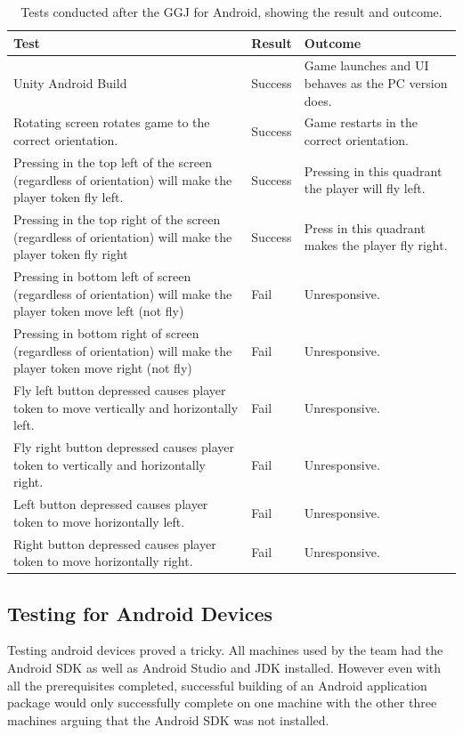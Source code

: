 \documentclass[12pt]{article}
\begin{document}
\begin{table}[H]
\centering
\begin{tabular}{| p{6cm} | p{1.5cm} | p{6cm} |}
     \hline
     \bf Test & \bf Result & \bf Outcome\\ \hline
     Unity Android Build & Success & Game launches and UI behaves as the PC version does.\\ \hline
     Rotating screen rotates game to the correct orientation. & Success & Game restarts in the correct orientation.\\ \hline
     Pressing in the top left of the screen (regardless of orientation) will make the player token fly left. & Success & Pressing in this quadrant the player will fly left. \\ \hline
     Pressing in the top right of the screen (regardless of orientation) will make the player token fly right & Success & Press in this quadrant makes the player fly right.\\ \hline
     Pressing in bottom left of screen (regardless of orientation) will make the player token move left (not fly)  & Fail & Unresponsive. \\ \hline
     Pressing in bottom right of screen (regardless of orientation) will make the player token move right (not fly)  & Fail & Unresponsive. \\ \hline
     Fly left button depressed causes player token to move vertically and horizontally left. & Fail & Unresponsive. \\ \hline
     Fly right button depressed causes player token to vertically and horizontally right. & Fail & Unresponsive. \\ \hline
     Left button depressed causes player token to move horizontally left. & Fail & Unresponsive. \\ \hline
     Right button depressed causes player token to move horizontally right. & Fail & Unresponsive. \\ \hline
     
\end{tabular}
\caption{Tests conducted after the GGJ for Android, showing the result and outcome.}
\label{tab:androidtestingtable}
\end{table}

\subsection{Testing for Android Devices}
Testing android devices proved a tricky. All machines used by the team had the Android SDK as well as Android Studio and JDK installed. However even with all the prerequisites completed, successful building of an Android application package would only successfully complete on one machine with the other three machines arguing that the Android SDK was not installed. 
\end{document}
